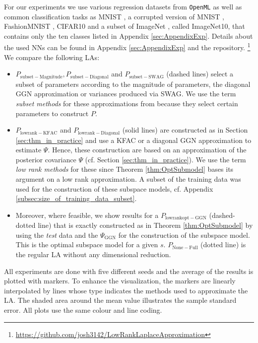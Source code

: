 For our experiments we use various regression datasets from \texttt{OpenML} \cite{OpenML2013} \cite{OpenMLPython2019} as well as common classification tasks as MNIST \cite{LeCun1998mnist}, a corrupted version of MNIST \cite{Mu2019mnistc}, FashionMNIST \cite{Xiao2017FashionMNIST}, CIFAR10 \cite{Krizhevsky2009cifar} and a subset of ImageNet \cite{ImageNet2009}, called ImageNet10, that contains only the ten classes listed in Appendix \ref{sec:AppendixExp}. Details about the used NNs can be found in Appendix \ref{sec:AppendixExp} and the repository.%
    \footnote{{\scriptsize \url{https://github.com/josh3142/LowRankLaplaceApproximation}}}
We compare the following LAs:
\begin{itemize}
    \item $P_{\mathrm{subset-Magnitude}}, P_{\mathrm{subset-Diagonal}}$ and $P_{\mathrm{subset-SWAG}}$ (dashed lines) select a subset of parameters according to the magnitude of parameters, the diagonal GGN approximation or variances produced via SWAG. We use the term \textit{subset methods} for these approximations from \cite{Daxberger2021,LaplaceRedux2021} because they select certain parameters to construct $P$. 
    \item $P_{\mathrm{lowrank-KFAC}}$ and $P_{\mathrm{lowrank-Diagonal}}$ (solid lines) are constructed as in Section \ref{sec:thm_in_practice} and use a KFAC or a diagonal GGN approximation to estimate $\Psi$. Hence, these construction are based on an approximation of the posterior covariance $\Psi$ (cf. Section \ref{sec:thm_in_practice}). We use the term \textit{low rank methods} for these since Theorem \ref{thm:OptSubmodel} bases its argument on a low rank approximation. A subset of the training data was used for the construction of these subspace models, cf. Appendix \ref{subsec:size_of_training_data_subset}.
    \item Moreover, where feasible, we show results for a $P_{\mathrm{lowrankopt-GGN}}$ (dashed-dotted line) that is exactly constructed as in Theorem \ref{thm:OptSubmodel} by using the \emph{test} data and the $\Psi_{\mathrm{GGN}}$ for the construction of the subspace model. 
    This is the optimal subspace model for a given $s$. $P_{\mathrm{None-Full}}$ (dotted line) is the regular LA without any dimensional reduction.
\end{itemize}
All experiments are done with five different seeds and the average of the results is plotted with markers. To enhance the visualization, the markers are linearly interpolated by lines whose type indicates the methods used to approximate the LA. The shaded area around the mean value illustrates the sample standard error. All plots use the same colour and line coding.

